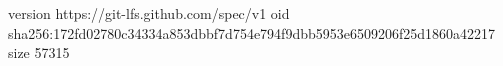 version https://git-lfs.github.com/spec/v1
oid sha256:172fd02780c34334a853dbbf7d754e794f9dbb5953e6509206f25d1860a42217
size 57315
